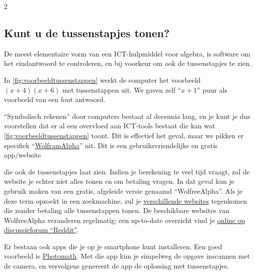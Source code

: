 \begin{multicols} {2}
    

    
    \subsection{Kunt u de tussenstapjes tonen?}
    De meest elementaire vorm van een ICT-hulpmiddel voor algebra, is software om het eindantwoord te controleren, en bij voorkeur om ook de tussenstapjes te zien.

   
    
    In \autoref{fig:voorbeeldtussenstappen} werkt de computer het voorbeeld \(\left(x+4\right)\left(x+6\right)\) met tussenstappen uit.
    We gaven zelf ``\(x+1\)'' puur als voorbeeld van een fout antwoord.

 ``Symbolisch rekenen'' door computers bestaat al decennia lang, en je kunt je dus voorstellen dat er al een overvloed aan ICT-tools bestaat die kan wat \autoref{fig:voorbeeldtussenstappen} toont.
    Dit is effectief het geval, maar we pikken er specifiek ``\href{https://www.wolframalpha.com/input?i=factor+x%5E2-y%5E2}{WolframAlpha}'' uit.
    Dit is een gebruiksvriendelijke en gratis app/website

    

     

    die ook de tussenstapjes laat zien.
    Indien je berekening te veel tijd vraagt, zal de website je echter niet alles tonen en om betaling vragen.
    In dat geval kun je gebruik maken van een gratis, afgeleide versie genaamd ``WolfreeAlpha''.
    Als je deze term opzoekt in een zoekmachine, zul je \href{https://wolfreealpha.onrender.com/}{verschillende websites} tegenkomen die zonder betaling alle tussenstappen tonen.
    De beschikbare websites van WolfreeAlpha veranderen regelmatig; een up-to-date overzicht vind je \href{https://www.reddit.com/r/GetStudying/comments/x4luun/get_wolframalpha_pro_feature_for_free/}{online op discussieforum ``Reddit''}.
    
    Er bestaan ook apps die je op je smartphone kunt installeren.
    Een goed voorbeeld is \href{https://photomath.com/}{Photomath}.
    Met die app kun je simpelweg de opgave inscannen met de camera, en vervolgens genereert de app de oplossing met tussenstapjes.
    

\end{multicols}

